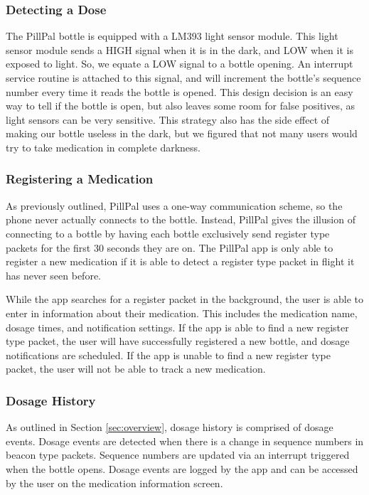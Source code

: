 \documentclass[sigconf]{acmart}
\begin{document}
\subsubsection{Detecting a Dose}
The PillPal bottle is equipped with a LM393 light sensor module. This light sensor module sends a HIGH signal when it is in the dark, and LOW when it is exposed to light. So, we equate a LOW signal to a bottle opening. An interrupt service routine is attached to this signal, and will increment the bottle's sequence number every time it reads the bottle is opened. This design decision is an easy way to tell if the bottle is open, but also leaves some room for false positives, as light sensors can be very sensitive. This strategy also has the side effect of making our bottle useless in the dark, but we figured that not many users would try to take medication in complete darkness.

\subsubsection{Registering a Medication}
As previously outlined, PillPal uses a one-way communication scheme, so the phone never actually connects to the bottle. Instead, PillPal gives the illusion of connecting to a bottle by having each bottle exclusively send register type packets for the first 30 seconds they are on. The PillPal app is only able to register a new medication if it is able to detect a register type packet in flight it has never seen before.

While the app searches for a register packet in the background, the user is able to enter in information about their medication. This includes the medication name, dosage times, and notification settings. If the app is able to find a new register type packet, the user will have successfully registered a new bottle, and dosage notifications are scheduled. If the app is unable to find a new register type packet, the user will not be able to track a new medication.

\subsubsection{Dosage History}
As outlined in Section \ref{sec:overview}, dosage history is comprised of dosage events. Dosage events are detected when there is a change in sequence numbers in beacon type packets. Sequence numbers are updated via an interrupt triggered when the bottle opens. Dosage events are logged by the app and can be accessed by the user on the medication information screen.
\end{document}
